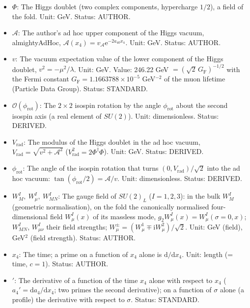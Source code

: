 \documentclass[
  10pt,
]{article}
\providecommand{\tightlist}{%
  \setlength{\itemsep}{0pt}\setlength{\parskip}{0pt}}
\begin{document}
\begin{itemize}
\tightlist
\item
  \(\Phi\): The Higgs doublet (two complex components, hypercharge
  \(1/2\)), a field of the fold. Unit: GeV. Status: AUTHOR.
\item
  \(\mathcal{A}\): The author's ad hoc upper component of the Higgs
  vacuum, almightyAdHoc,
  \(\mathcal{A}(x_4) = v_{\mathcal{A}}\mathrm{e}^{-2a_{40}x_4}\). Unit:
  GeV. Status: AUTHOR.
\item
  \(v\): The vacuum expectation value of the lower component of the
  Higgs doublet, \(v^2 = -\mu^2/\lambda\). Unit: GeV. Value: 246.22 GeV
  \(= (\sqrt2\,G_{\mathrm{F}})^{-1/2}\) with the Fermi constant
  \(G_{\mathrm{F}} = 1.1663788\times10^{-5}\) GeV\(^{-2}\) of the muon
  lifetime (Particle Data Group). Status: STANDARD.
\item
  \(\mathcal{O}(\phi_{\mathrm{rot}})\): The \(2 \times 2\) isospin
  rotation by the angle \(\phi_{\mathrm{rot}}\) about the second isospin
  axis (a real element of \(SU(2)\)). Unit: dimensionless. Status:
  DERIVED.
\item
  \(V_{\mathrm{rad}}\): The modulus of the Higgs doublet in the ad hoc
  vacuum, \(V_{\mathrm{rad}} = \sqrt{v^2 + \mathcal{A}^2}\)
  (\(V_{\mathrm{rad}}^2 = 2\Phi^\dagger\Phi\)). Unit: GeV. Status:
  DERIVED.
\item
  \(\phi_{\mathrm{rot}}\): The angle of the isospin rotation that turns
  \((0, V_{\mathrm{rad}})/\sqrt2\) into the ad hoc vacuum:
  \(\tan(\phi_{\mathrm{rot}}/2) = \mathcal{A}/v\). Unit: dimensionless.
  Status: DERIVED.
\item
  \(W^I_M,\ W^I_\mu,\ W^I_{MN}\): The gauge field of \(SU(2)_L\)
  (\(I = 1, 2, 3\)): in the bulk \(W^I_M\) (geometric normalisation), on
  the fold the canonically normalised four-dimensional field
  \(W^I_\mu(x)\) of its massless mode,
  \(g_2W^I_\mu(x) = W^I_\mu(\sigma = 0, x)\); \(W^I_{MN}\),
  \(W^I_{\mu\nu}\) their field strengths;
  \(W^\pm_\mu = (W^1_\mu \mp \mathrm{i}W^2_\mu)/\sqrt2\). Unit: GeV
  (field), GeV\(^2\) (field strength). Status: AUTHOR.
\item
  \(x_4\): The time; a prime on a function of \(x_4\) alone is
  \(\mathrm{d}/\mathrm{d}x_4\). Unit: length (= time, \(c = 1\)).
  Status: AUTHOR.
\item
  \({}'\): The derivative of a function of the time \(x_4\) alone with
  respect to \(x_4\) (\(a_4' = \mathrm{d}a_4/\mathrm{d}x_4\); two primes
  the second derivative); on a function of \(\sigma\) alone (a profile)
  the derivative with respect to \(\sigma\). Status: STANDARD.

\end{itemize}
\end{document}
